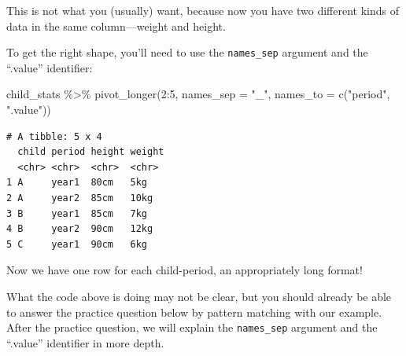 \documentclass[
  letterpaper,
  DIV=11,
  numbers=noendperiod]{scrreprt}
\newenvironment{Shaded}{\begin{snugshade}}{\end{snugshade}}
\newcommand{\AttributeTok}[1]{\textcolor[rgb]{0.40,0.45,0.13}{#1}}
\newcommand{\DecValTok}[1]{\textcolor[rgb]{0.68,0.00,0.00}{#1}}
\newcommand{\FunctionTok}[1]{\textcolor[rgb]{0.28,0.35,0.67}{#1}}
\newcommand{\NormalTok}[1]{\textcolor[rgb]{0.00,0.23,0.31}{#1}}
\newcommand{\SpecialCharTok}[1]{\textcolor[rgb]{0.37,0.37,0.37}{#1}}
\newcommand{\StringTok}[1]{\textcolor[rgb]{0.13,0.47,0.30}{#1}}
\begin{document}
This is not what you (usually) want, because now you have two different
kinds of data in the same column---weight and height.

To get the right shape, you'll need to use the \texttt{names\_sep}
argument and the ``.value'' identifier:

\begin{Shaded}
\begin{Highlighting}[]
\NormalTok{child\_stats }\SpecialCharTok{\%\textgreater{}\%} 
  \FunctionTok{pivot\_longer}\NormalTok{(}\DecValTok{2}\SpecialCharTok{:}\DecValTok{5}\NormalTok{, }
               \AttributeTok{names\_sep =} \StringTok{"\_"}\NormalTok{,}
               \AttributeTok{names\_to =} \FunctionTok{c}\NormalTok{(}\StringTok{"period"}\NormalTok{, }\StringTok{".value"}\NormalTok{))}
\end{Highlighting}
\end{Shaded}

\begin{verbatim}
# A tibble: 5 x 4
  child period height weight
  <chr> <chr>  <chr>  <chr> 
1 A     year1  80cm   5kg   
2 A     year2  85cm   10kg  
3 B     year1  85cm   7kg   
4 B     year2  90cm   12kg  
5 C     year1  90cm   6kg   
\end{verbatim}

Now we have one row for each child-period, an appropriately long format!

What the code above is doing may not be clear, but you should already be
able to answer the practice question below by pattern matching with our
example. After the practice question, we will explain the
\texttt{names\_sep} argument and the ``.value'' identifier in more
depth.
\end{document}
